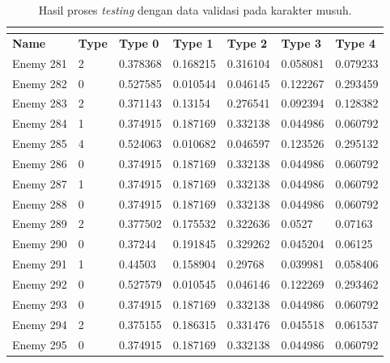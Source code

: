\begin{longtable}{|l|l|l|l|l|l|l|}
	\caption{Hasil proses \textit{testing} dengan data validasi pada karakter musuh.}
	\vspace{1ex}
	\label{tb:enemy_valid_result}\\
	\hline
	\rowcolor[HTML]{C0C0C0} 
	\textbf{Name} & \textbf{Type} & \textbf{Type 0} & \textbf{Type 1} & \textbf{Type 2} & \textbf{Type 3} & \textbf{Type 4} \\ \hline
	Enemy 281 & 2 & 0.378368 & {\color[HTML]{FE0000} 0.168215} & 0.316104 & 0.058081 & 0.079233 \\ \hline
	Enemy 282 & 0 & {\color[HTML]{FE0000} 0.527585} & 0.010544 & 0.046145 & 0.122267 & 0.293459 \\ \hline
	Enemy 283 & 2 & 0.371143 & 0.13154 & {\color[HTML]{FE0000} 0.276541} & 0.092394 & 0.128382 \\ \hline
	Enemy 284 & 1 & 0.374915 & {\color[HTML]{FE0000} 0.187169} & 0.332138 & 0.044986 & 0.060792 \\ \hline
	Enemy 285 & 4 & 0.524063 & 0.010682 & 0.046597 & 0.123526 & {\color[HTML]{FE0000} 0.295132} \\ \hline
	Enemy 286 & 0 & {\color[HTML]{009901} 0.374915} & 0.187169 & 0.332138 & 0.044986 & 0.060792 \\ \hline
	Enemy 287 & 1 & 0.374915 & {\color[HTML]{FE0000} 0.187169} & 0.332138 & 0.044986 & 0.060792 \\ \hline
	Enemy 288 & 0 & {\color[HTML]{FE0000} 0.374915} & 0.187169 & 0.332138 & 0.044986 & 0.060792 \\ \hline
	Enemy 289 & 2 & 0.377502 & 0.175532 & {\color[HTML]{FE0000} 0.322636} & 0.0527 & 0.07163 \\ \hline
	Enemy 290 & 0 & {\color[HTML]{009901} 0.37244} & 0.191845 & 0.329262 & 0.045204 & 0.06125 \\ \hline
	Enemy 291 & 1 & 0.44503 & {\color[HTML]{FE0000} 0.158904} & 0.29768 & 0.039981 & 0.058406 \\ \hline
	Enemy 292 & 0 & {\color[HTML]{009901} 0.527579} & 0.010545 & 0.046146 & 0.122269 & 0.293462 \\ \hline
	Enemy 293 & 0 & {\color[HTML]{009901} 0.374915} & 0.187169 & 0.332138 & 0.044986 & 0.060792 \\ \hline
	Enemy 294 & 2 & 0.375155 & 0.186315 & {\color[HTML]{FE0000} 0.331476} & 0.045518 & 0.061537 \\ \hline
	Enemy 295 & 0 & {\color[HTML]{009901} 0.374915} & 0.187169 & 0.332138 & 0.044986 & 0.060792 \\ \hline

\end{longtable}
